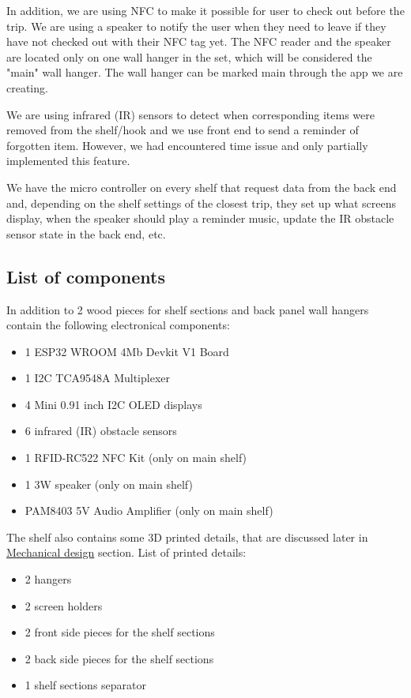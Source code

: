 \documentclass{article}
\begin{document}
In addition, we are using NFC to make it possible for user to check out before the trip. We are using a speaker to notify the user when they need to leave if they have not checked out with their NFC tag yet. The NFC reader and the speaker are located only on one wall hanger in the set, which will be considered the "main" wall hanger. The wall hanger can be marked main through the app we are creating. 

We are using infrared (IR) sensors to detect when corresponding items were removed from the shelf/hook and we use front end to send a reminder of forgotten item. However, we had encountered time issue and only partially implemented this feature. 

We have the micro controller on every shelf that request data from the back end and, depending on the shelf settings of the closest trip, they set up what screens display, when the speaker should play a reminder music, update the IR obstacle sensor state in the back end, etc. 

\subsection{List of components}

In addition to 2 wood pieces for shelf sections and back panel wall hangers contain the following electronical components:
\begin{itemize}
    \item 1 ESP32 WROOM 4Mb Devkit V1 Board
    \item 1 I2C TCA9548A Multiplexer 
    \item 4 Mini 0.91 inch I2C OLED displays
    \item 6 infrared (IR) obstacle sensors 
    \item 1 RFID-RC522 NFC Kit (only on main shelf)
    \item 1 3W speaker (only on main shelf)
    \item PAM8403 5V Audio Amplifier (only on main shelf)
\end{itemize}

The shelf also contains some 3D printed details, that are discussed later in \hyperref[sec:mechanical]{Mechanical design} section. List of printed details: 

\begin{itemize}
    \item 2 hangers
    \item 2 screen holders
    \item 2 front side pieces for the shelf sections
    \item 2 back side pieces for the shelf sections
    \item 1 shelf sections separator 
\end{itemize}
\end{document}
